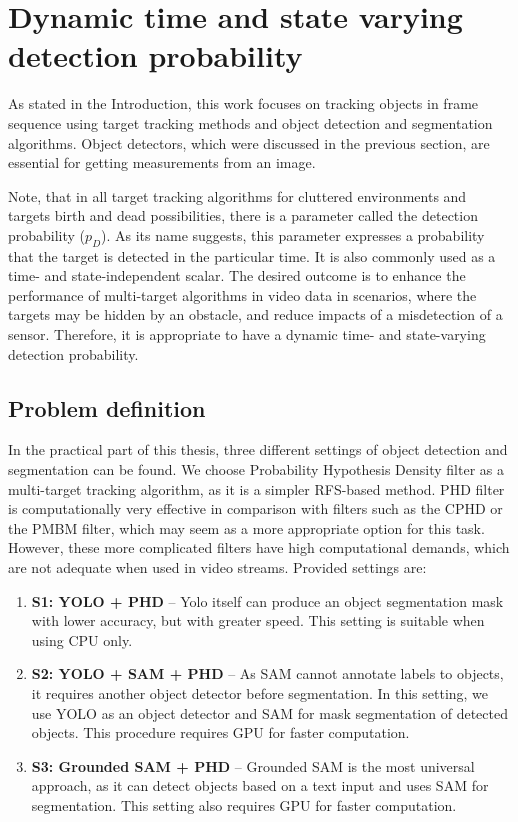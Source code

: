 \chapter{Dynamic time and state varying detection probability}
As stated in the Introduction, this work focuses on tracking objects in frame sequence using target tracking methods
and
object detection
and
segmentation algorithms. Object detectors, which were discussed in the previous section, are essential for getting
measurements
from an image.

Note, that in all target tracking algorithms for cluttered environments and targets
birth and dead possibilities, there is a parameter called the detection probability ($p_D$). As its name
suggests, this parameter expresses a probability that the target is detected in the particular time. It is also commonly
used
as a
time- and state-independent scalar. The desired outcome is to enhance the performance of multi-target
algorithms
in video data
in scenarios, where the targets may be hidden by an obstacle, and reduce impacts of a misdetection of a sensor.
Therefore, it
is appropriate to have a dynamic time- and state-varying detection probability.
\section{Problem definition}
\label{sec:mphd_problemDef}
In the practical part of this thesis, three different settings of object detection and segmentation can be found.
We choose Probability Hypothesis Density filter as a multi-target tracking algorithm, as it is a simpler
RFS-based method. PHD filter is computationally very effective in comparison with filters such as the CPHD or the
PMBM filter,
which may seem as a more appropriate option for this task. However, these more complicated filters have high
computational demands, which
are not adequate when used in video streams. Provided settings are:
\begin{enumerate}
  \item \textbf{S1: YOLO + PHD} -- Yolo itself can produce an object segmentation mask with lower accuracy, but with
  greater
  speed. This setting is suitable when using CPU only.
  \item \textbf{S2: YOLO + SAM + PHD} -- As SAM cannot annotate labels to objects, it requires another object detector
  before segmentation. In this setting, we use YOLO as an object detector and SAM for mask segmentation of detected
  objects. This procedure requires GPU for faster computation.
  \item \textbf{S3: Grounded SAM + PHD} -- Grounded SAM is the most universal approach, as it can detect objects based
  on a text input and uses SAM for segmentation. This setting also requires GPU for faster computation.
\end{enumerate}


